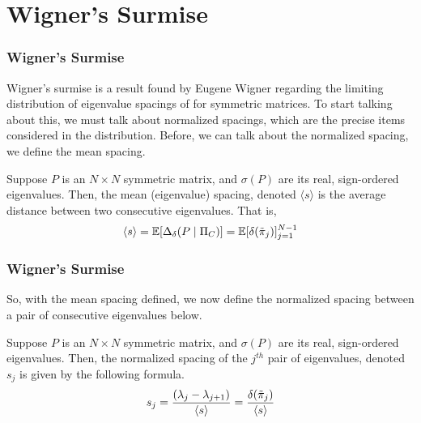 \section{Wigner's Surmise}

\begin{frame} \frametitle{Wigner's Surmise}

Wigner's surmise is a result found by Eugene Wigner regarding the limiting distribution of eigenvalue spacings of for symmetric matrices.
To start talking about this, we must talk about normalized spacings, which are the precise items considered in the distribution.
Before, we can talk about the normalized spacing, we define the mean spacing.

\begin{alertblock}{}
Suppose $P$ is an $N \times N$ symmetric matrix, and $\sigma(P)$ are its real, sign-ordered eigenvalues.
Then, the mean (eigenvalue) spacing, denoted $\langle s \rangle$ is the average distance between two consecutive eigenvalues. That is,
$$\langle s \rangle = \mathbb{E}[\Delta_\delta(P \mid \Pi_C)] = \mathbb{E}[\delta({\tilde{\pi}}_{j})]_{j = 1}^{N - 1}$$
\end{alertblock}

\end{frame}


\begin{frame} \frametitle{Wigner's Surmise}

\noindent So, with the mean spacing defined, we now define the normalized spacing between a pair of consecutive eigenvalues below.

\begin{alertblock}{}
Suppose $P$ is an $N \times N$ symmetric matrix, and $\sigma(P)$ are its real, sign-ordered eigenvalues.
Then, the normalized spacing of the $j^{th}$ pair of eigenvalues, denoted $s_j$ is given by the following formula.
$$s_j = \frac{(\lambda_j - \lambda_{j+1})}{{\langle s \rangle}} = \frac{\delta({\tilde{\pi}}_{j})}{\langle s \rangle}$$
\end{alertblock}

\end{frame}


